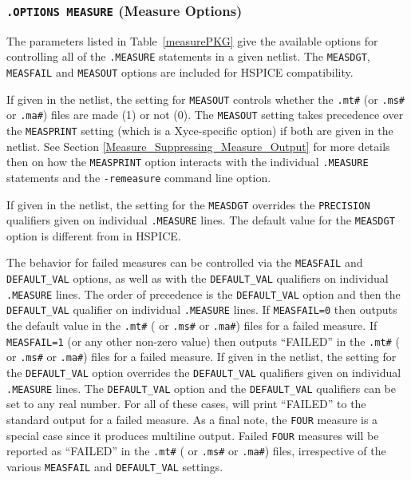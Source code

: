 

\subsubsection{\texttt{.OPTIONS MEASURE} (Measure Options)}
The parameters listed in Table~\ref{measurePKG} give the available
options for controlling all of the \texttt{.MEASURE} statements in
a given \Xyce{} netlist.  The \texttt{MEASDGT}, \texttt{MEASFAIL}
and \texttt{MEASOUT} options are included for HSPICE compatibility.

If given in the netlist, the setting for \texttt{MEASOUT} controls whether 
the \texttt{.mt\#} (or \texttt{.ms\#} or \texttt{.ma\#}) files are made (1) or not (0). 
The \texttt{MEASOUT} setting takes precedence over the \texttt{MEASPRINT} setting 
(which is a Xyce-specific option) if both are given in the netlist.
See Section \ref{Measure_Suppressing_Measure_Output} for more details then on 
how the \texttt{MEASPRINT} option interacts with the individual 
\texttt {.MEASURE} statements and the \texttt{-remeasure} command 
line option.

If given in the netlist, the setting for the \texttt{MEASDGT} overrides the 
\texttt{PRECISION} qualifiers given on individual \texttt{.MEASURE} lines. 
The default value for the \texttt{MEASDGT} option is different from in HSPICE.

The \Xyce{} behavior for failed measures can be controlled via the \texttt{MEASFAIL}
and \texttt{DEFAULT\_VAL} options, as well as with the \texttt{DEFAULT\_VAL} 
qualifiers on individual \texttt{.MEASURE} lines.  The order of precedence is
the \texttt{DEFAULT\_VAL} option and then the \texttt{DEFAULT\_VAL} qualifier on
individual \texttt{.MEASURE} lines.  If \texttt{MEASFAIL=0} then \Xyce{} outputs
the default value in the \texttt{.mt\#} ( or \texttt{.ms\#} or \texttt{.ma\#})
files for a failed measure.  If \texttt{MEASFAIL=1} (or any other non-zero 
value) then \Xyce{} outputs ``FAILED'' in the \texttt{.mt\#} ( or \texttt{.ms\#} or \texttt{.ma\#}) 
files for a failed measure.  If given in the netlist, the setting for the 
\texttt{DEFAULT\_VAL} option overrides the \texttt{DEFAULT\_VAL} qualifiers given 
on individual \texttt{.MEASURE} lines.  The \texttt{DEFAULT\_VAL} option and the 
\texttt{DEFAULT\_VAL} qualifiers can be set to any real number.  For all of these 
cases, \Xyce{} will print ``FAILED'' to the standard output for a failed measure.
As a final note, the \texttt{FOUR} measure is a special case since it produces multiline
output.  Failed \texttt{FOUR} measures will be reported as ``FAILED'' in the
\texttt{.mt\#} ( or \texttt{.ms\#} or \texttt{.ma\#}) files, irrespective of the various
\texttt{MEASFAIL} and \texttt{DEFAULT\_VAL} settings.

